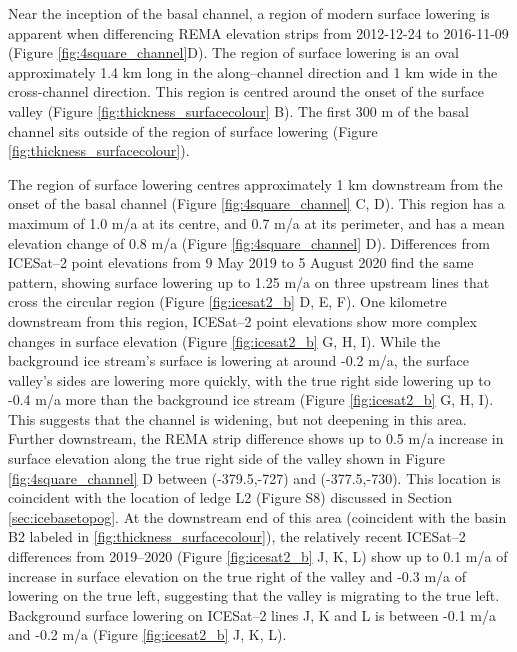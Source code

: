 Near the inception of the basal channel, a region of modern surface lowering is apparent when differencing REMA elevation strips from 2012-12-24 to 2016-11-09 (Figure \ref{fig:4square_channel}D). The region of surface lowering is an oval approximately 1.4 km long in the along--channel direction and 1 km wide in the cross-channel direction. This region is centred around the onset of the surface valley (Figure \ref{fig:thickness_surfacecolour} B).  The first 300 m of the basal channel sits outside of the region of surface lowering  (Figure \ref{fig:thickness_surfacecolour}). 

\newpage
The region of surface lowering centres  approximately 1 km downstream from the onset of the basal channel (Figure \ref{fig:4square_channel} C, D). This region has a maximum of 1.0 m/a at its centre, and 0.7 m/a at its perimeter, and has a mean elevation change of 0.8 m/a (Figure \ref{fig:4square_channel} D).  Differences from ICESat--2 point elevations from 9 May 2019 to 5 August 2020 find the same pattern, showing surface lowering up to 1.25 m/a on three upstream lines that cross the circular region (Figure \ref{fig:icesat2_b} D, E, F). 
One kilometre downstream from this region, ICESat--2 point elevations show more complex changes in surface elevation (Figure \ref{fig:icesat2_b} G, H, I). While the background ice stream's surface is lowering at around -0.2 m/a, the surface valley's sides are lowering more quickly, with the true right side  lowering up to -0.4 m/a more than the background ice stream (Figure \ref{fig:icesat2_b} G, H, I).  This suggests that the channel is widening, but not deepening in this area.
Further downstream, the REMA strip difference shows up to 0.5 m/a increase in surface elevation along the true right side of the valley shown in Figure \ref{fig:4square_channel} D between (-379.5,-727) and (-377.5,-730). This location is coincident with the location of ledge L2 (Figure S8) discussed in Section \ref{sec:icebasetopog}. At the downstream end of this area (coincident with the basin B2 labeled in \ref{fig:thickness_surfacecolour}), the relatively recent ICESat--2 differences from 2019--2020 (Figure \ref{fig:icesat2_b} J, K, L) show up to 0.1 m/a of increase in surface elevation on the true right of the valley and -0.3 m/a of lowering on the true left, suggesting that the valley is migrating to the true left. Background surface lowering on ICESat--2 lines J, K and L is between -0.1 m/a and -0.2 m/a (Figure \ref{fig:icesat2_b} J, K, L). 

